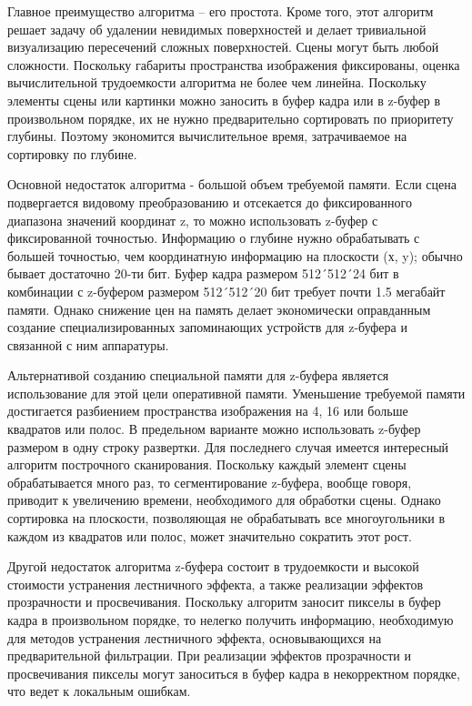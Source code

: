 Главное преимущество алгоритма – его простота. Кроме того, этот алгоритм решает задачу об удалении невидимых поверхностей и делает тривиальной визуализацию пересечений сложных поверхностей. Сцены могут быть любой сложности. Поскольку габариты пространства изображения фиксированы, оценка вычислительной трудоемкости алгоритма не более чем линейна. Поскольку элементы сцены или картинки можно заносить в буфер кадра или в z-буфер в произвольном порядке, их не нужно предварительно сортировать по приоритету глубины. Поэтому экономится вычислительное время, затрачиваемое на сортировку по глубине.

Основной недостаток алгоритма - большой объем требуемой памяти. Если сцена подвергается видовому преобразованию и отсекается до фиксированного диапазона значений координат z, то можно использовать z-буфер с фиксированной точностью. Информацию о глубине нужно обрабатывать с большей точностью, чем координатную информацию на плоскости (х, y); обычно бывает достаточно 20-ти бит. Буфер кадра размером 512´512´24 бит в комбинации с z-буфером размером 512´512´20 бит требует почти 1.5 мегабайт памяти. Однако снижение цен на память делает экономически оправданным создание специализированных запоминающих устройств для z-буфера и связанной с ним аппаратуры.

Альтернативой созданию специальной памяти для z-буфера является использование для этой цели оперативной памяти. Уменьшение требуемой памяти достигается разбиением пространства изображения на 4, 16 или больше квадратов или полос. В предельном варианте можно использовать z-буфер размером в одну строку развертки. Для последнего случая имеется интересный алгоритм построчного сканирования. Поскольку каждый элемент сцены обрабатывается много раз, то сегментирование z-буфера, вообще говоря, приводит к увеличению времени, необходимого для обработки сцены. Однако сортировка на плоскости, позволяющая не обрабатывать все многоугольники в каждом из квадратов или полос, может значительно сократить этот рост.

Другой недостаток алгоритма z-буфера состоит в трудоемкости и высокой стоимости устранения лестничного эффекта, а также реализации эффектов прозрачности и просвечивания. Поскольку алгоритм заносит пикселы в буфер кадра в произвольном порядке, то нелегко получить информацию, необходимую для методов устранения лестничного эффекта, основывающихся на предварительной фильтрации. При реализации эффектов прозрачности и просвечивания пикселы могут заноситься в буфер кадра в некорректном порядке, что ведет к локальным ошибкам. 


